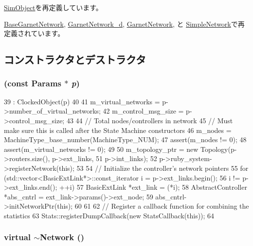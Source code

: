\hyperlink{classSimObject_a0f0761d2db586a23bb2a2880b8f387bb}{SimObject}を再定義しています。

\hyperlink{classBaseGarnetNetwork_a9b387eae2084a167c00ec5550159a245}{BaseGarnetNetwork}, \hyperlink{classGarnetNetwork__d_aa723bef17ce7ec9b7c3ad12002aef3bb}{GarnetNetwork\_\-d}, \hyperlink{classGarnetNetwork_af1f02e00eac1bf3521780f99a28259a5}{GarnetNetwork}, と \hyperlink{classSimpleNetwork_acfd32ca05df7999ec705e4800d022dbf}{SimpleNetwork}で再定義されています。

\subsection{コンストラクタとデストラクタ}
\hypertarget{classNetwork_a1afbde22f88c23c384879624c885d0ef}{
\subsubsection[{Network}]{ (const {\bf Params} $\ast$ {\em p})}}
\label{classNetwork_a1afbde22f88c23c384879624c885d0ef}



\begin{DoxyCode}
39     : ClockedObject(p)
40 {
41     m_virtual_networks = p->number_of_virtual_networks;
42     m_control_msg_size = p->control_msg_size;
43 
44     // Total nodes/controllers in network
45     // Must make sure this is called after the State Machine constructors
46     m_nodes = MachineType_base_number(MachineType_NUM);
47     assert(m_nodes != 0);
48     assert(m_virtual_networks != 0);
49 
50     m_topology_ptr = new Topology(p->routers.size(), p->ext_links,
51                                   p->int_links);
52     p->ruby_system->registerNetwork(this);
53 
54     // Initialize the controller's network pointers
55     for (std::vector<BasicExtLink*>::const_iterator i = p->ext_links.begin();
56          i != p->ext_links.end(); ++i) {
57         BasicExtLink *ext_link = (*i);
58         AbstractController *abs_cntrl = ext_link->params()->ext_node;
59         abs_cntrl->initNetworkPtr(this);
60     }
61 
62     // Register a callback function for combining the statistics
63     Stats::registerDumpCallback(new StatsCallback(this));
64 }
\end{DoxyCode}
\hypertarget{classNetwork_a8a5c4f102e29b4f52af55a6d167c5990}{
\subsubsection[{$\sim$Network}]{\setlength{\rightskip}{0pt plus 5cm}virtual $\sim${\bf Network} ()}}
\label{classNetwork_a8a5c4f102e29b4f52af55a6d167c5990}



